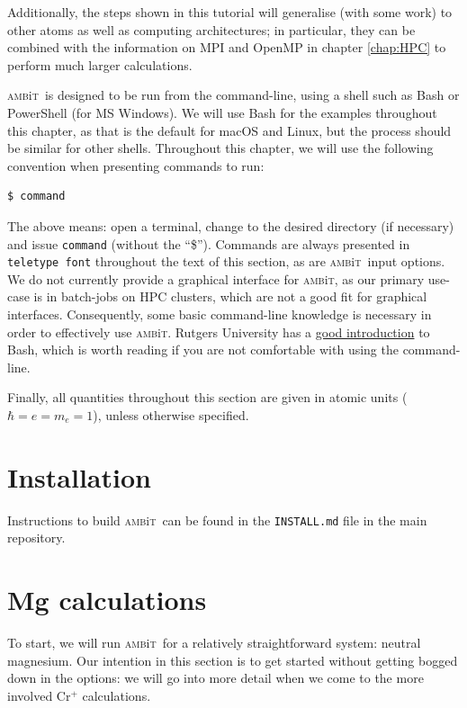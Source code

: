 \documentclass{report}
\newcommand{\ambit}{\textsc{amb}{\footnotesize i}\textsc{t}}
\begin{document}
Additionally, the steps shown in this tutorial will generalise
(with some work) to other atoms as well as computing architectures; in particular, they can be
combined with the information on MPI and OpenMP in chapter \ref{chap:HPC} to perform much larger
calculations.

\ambit\  is designed to be run from the command-line, using a shell such as Bash or PowerShell (for MS
Windows). We will
use Bash for the examples throughout this chapter, as that is the default for macOS and Linux, but the
process should be similar for other shells. Throughout this chapter, we will use the following
convention when presenting commands to run:

\begin{verbatim}
$ command
\end{verbatim}

The above means: open a terminal, change to the desired directory (if necessary) and issue
\texttt{command} (without the ``\$''). Commands are always presented in \texttt{teletype font}
throughout the text of this section, as are \ambit\  input options. We do not currently provide a 
graphical interface for \ambit, as our primary use-case is in batch-jobs on HPC clusters, which are not
a good fit for graphical interfaces. Consequently, some basic command-line knowledge is necessary in
order to effectively use \ambit. Rutgers University has a
\href{http://linuxcourse.rutgers.edu/documents/Bash-Beginners-Guide/}{good introduction} to Bash, which
is worth reading if you are not comfortable with using the command-line.

Finally, all quantities throughout this section are given in atomic units ($\hbar = e = m_e = 1$), 
unless otherwise specified.

\section{Installation}
Instructions to build \ambit\ can be found in the \texttt{INSTALL.md} file in the main repository.

\section{Mg calculations}

To start, we will run \ambit\ for a relatively straightforward system: neutral magnesium. Our intention in this section is to get started without getting bogged down in the options: we will go into more detail when we come to the more involved Cr$^+$ calculations.
\end{document}
